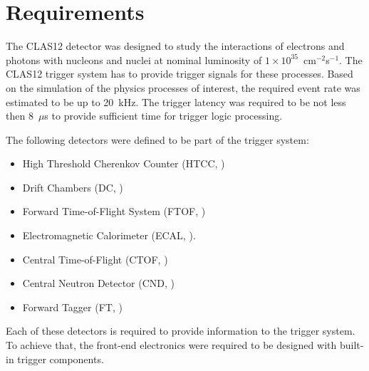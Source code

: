 \section{Requirements}

The CLAS12 detector was designed to study the interactions of electrons and photons with nucleons and nuclei at nominal luminosity of $1\times 10^{35}$~cm$^{-2}$s$^{-1}$. The CLAS12 trigger system has to provide trigger signals for these processes. Based on the simulation of the physics processes of interest, the required event rate was estimated to be up to 20~kHz. The trigger latency was required to be not less then 8~$\mu$s to provide sufficient time for trigger logic processing.


The following detectors were defined to be part of the trigger system:

\begin{itemize}
	\item High Threshold Cherenkov Counter (HTCC, \cite{htcc-ref})
	\item Drift Chambers (DC, \cite{dc-ref})
	\item Forward Time-of-Flight System (FTOF, \cite{ftof-ref})
	\item Electromagnetic Calorimeter (ECAL, \cite{ec-ref}).
	\item Central Time-of-Flight (CTOF, \cite{ctof-ref})
	\item Central Neutron Detector (CND, \cite{cnd-ref})
	\item Forward Tagger (FT, \cite{ft-ref})
\end{itemize}

Each of these detectors is required to provide information to the trigger system. To achieve that, the front-end electronics were required to be designed with built-in trigger components. 

 
